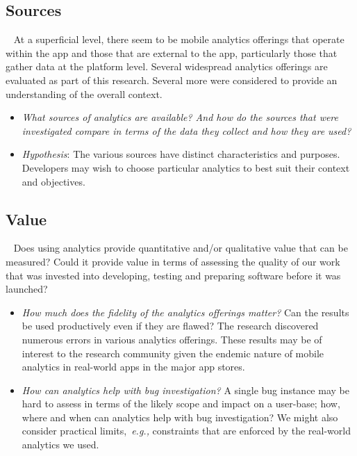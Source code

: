 \subsection{Sources}~\label{section-sources}
At a superficial level, there seem to be mobile analytics offerings that operate within the app and those that are external to the app, particularly those that gather data at the platform level. Several widespread analytics offerings are evaluated as part of this research. Several more were considered to provide an understanding of the overall context.
\begin{itemize}
    \item \emph{What sources of analytics are available? And how do the sources that were investigated compare in terms of the data they collect and how they are used?}
    \item \emph{Hypothesis}: The various sources have distinct characteristics and purposes. Developers may wish to choose particular analytics to best suit their context and objectives.
\end{itemize}

\subsection{Value}~\label{section-value}
Does using analytics provide quantitative and/or qualitative value that can be measured? Could it provide value in terms of assessing the quality of our work that was invested into developing, testing and preparing software before it was launched?
\begin{itemize}
    \item \emph{How much does the fidelity of the analytics offerings matter?} Can the results be used productively even if they are flawed? The research discovered numerous errors in various analytics offerings. These results may be of interest to the research community given the endemic nature of mobile analytics in real-world apps in the major app stores.

    \item \emph{How can analytics help with bug investigation?} A single bug instance may be hard to assess in terms of the likely scope and impact on a user-base; how, where and when can analytics help with bug investigation? We might also consider practical limits,~\emph{e.g.,} constraints that are enforced by the real-world analytics we used. 
\end{itemize}

